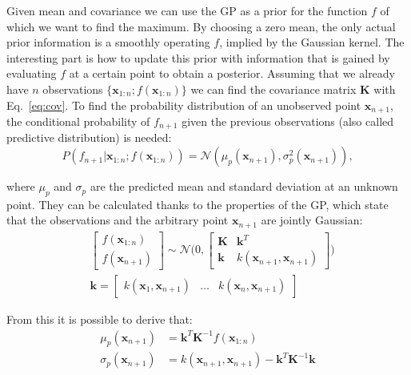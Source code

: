 Given mean and covariance we can use the GP as a prior for the function $f$ of
which we want to find the maximum. By choosing a zero mean, the only actual
prior information is a smoothly operating $f$, implied by the Gaussian kernel.
The interesting part is how to update this prior with information that is
gained by evaluating $f$ at a certain point to obtain a posterior.  Assuming that
we already have $n$ observations $\{\mathbf{x}_{1:n} ; f(\mathbf{x}_{1:n})\}$
we can find the covariance matrix $\mathbf{K}$ with Eq.~\ref{eq:cov}.  To find
the probability distribution of an unobserved point $\mathbf{x}_{n+1}$, the
conditional probability of $f_{n+1}$ given the previous observations (also
called predictive distribution) is needed:
\begin{equation}
  P(f_{n+1} | \mathbf{x}_{1:n} ; f(\mathbf{x}_{1:n})) 
    = \mathcal{N}(\mu_p(\mathbf{x}_{n+1}) , \sigma_p^2(\mathbf{x}_{n+1})),
\end{equation}

where $\mu_p$ and $\sigma_p$ are the predicted mean and standard deviation at
an unknown point.  They can be calculated thanks to the properties of the GP,
which state that the observations and the arbitrary point $\mathbf{x}_{n+1}$
are jointly Gaussian:
\begin{align}
  &\begin{bmatrix} f(\mathbf{x}_{1:n}) \\ f(\mathbf{x}_{n+1}) \end{bmatrix}
  \sim \mathcal{N} \bigg(
    0,  \begin{bmatrix} 
           \mathbf{K} & \mathbf{k}^T \\ 
           \mathbf{k} & k(\mathbf{x}_{n+1}, \mathbf{x}_{n+1})
        \end{bmatrix}
  \bigg) \\
  &\mathbf{k} = \begin{bmatrix}
      k(\mathbf{x}_1, \mathbf{x}_{n+1}) &
      \dots &
      k(\mathbf{x}_n, \mathbf{x}_{n+1})
  \end{bmatrix}
\end{align}

From this it is possible to derive that:
\begin{align}
  \mu_p (\mathbf{x}_{n+1}) &= \mathbf{k}^T \mathbf{K}^{-1} f(\mathbf{x}_{1:n}) \\
  \sigma_p (\mathbf{x}_{n+1}) &= k(\mathbf{x}_{n+1}, \mathbf{x}_{n+1}) 
                               - \mathbf{k}^T \mathbf{K}^{-1} \mathbf{k}
\end{align}

